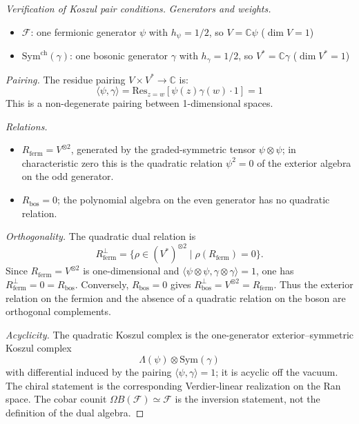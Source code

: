 \begin{proof}[Verification of Koszul pair conditions]
\noindent\emph{Generators and weights.}
\begin{itemize}
\item $\mathcal{F}$: one fermionic generator $\psi$ with $h_\psi = 1/2$, so $V = \mathbb{C}\psi$ ($\dim V = 1$)
\item $\mathrm{Sym}^{\mathrm{ch}}(\gamma)$: one bosonic generator $\gamma$ with $h_\gamma = 1/2$, so $V^* = \mathbb{C}\gamma$ ($\dim V^* = 1$)
\end{itemize}

\noindent\emph{Pairing.} The residue pairing $V \times V^* \to \mathbb{C}$ is:
\[\langle\psi, \gamma\rangle = \mathrm{Res}_{z=w}\left[\psi(z)\gamma(w) \cdot 1\right] = 1\]
This is a non-degenerate pairing between 1-dimensional spaces.

\noindent\emph{Relations.}
\begin{itemize}
\item $R_{\mathrm{ferm}} = V^{\otimes 2}$, generated by the
 graded-symmetric tensor $\psi\otimes\psi$; in characteristic
 zero this is the quadratic relation $\psi^2=0$ of the exterior
 algebra on the odd generator.
\item $R_{\mathrm{bos}} = 0$; the polynomial algebra on the
 even generator has no quadratic relation.
\end{itemize}

\noindent\emph{Orthogonality.}
The quadratic dual relation is
\[
R_{\mathrm{ferm}}^\perp
=\{\rho\in (V^*)^{\otimes 2}\mid
\rho(R_{\mathrm{ferm}})=0\}.
\]
Since $R_{\mathrm{ferm}}=V^{\otimes 2}$ is one-dimensional and
$\langle \psi\otimes\psi,\gamma\otimes\gamma\rangle=1$,
one has $R_{\mathrm{ferm}}^\perp=0=R_{\mathrm{bos}}$.
Conversely, $R_{\mathrm{bos}}=0$ gives
$R_{\mathrm{bos}}^\perp=V^{\otimes 2}=R_{\mathrm{ferm}}$.
Thus the exterior relation on the fermion and the absence of a
quadratic relation on the boson are orthogonal complements.

\noindent\emph{Acyclicity.} The quadratic Koszul complex is the
one-generator exterior--symmetric Koszul complex
\[
\Lambda(\psi)\otimes \mathrm{Sym}(\gamma)
\]
with differential induced by the pairing
$\langle\psi,\gamma\rangle=1$; it is acyclic off the vacuum.
The chiral statement is the corresponding Verdier-linear
realization on the Ran space. The cobar counit
$\Omega B(\mathcal F)\simeq\mathcal F$ is the inversion
statement, not the definition of the dual algebra.
\end{proof}





